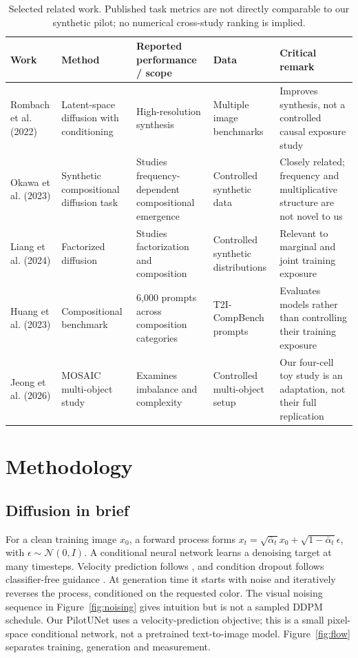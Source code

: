 \documentclass{article}
\begin{document}
\begin{table}[t]\centering\small
\caption{Selected related work. Published task metrics are not directly comparable to our synthetic pilot; no numerical cross-study ranking is implied.}
\begin{tabular}{p{2.0cm}p{3.2cm}p{2.5cm}p{2.7cm}p{3.8cm}}\toprule
Work & Method & Reported performance / scope & Data & Critical remark \\\midrule
Rombach et al. (2022) \cite{rombach2022} & Latent-space diffusion with conditioning & High-resolution synthesis & Multiple image benchmarks & Improves synthesis, not a controlled causal exposure study \\
Okawa et al. (2023) \cite{okawa2023} & Synthetic compositional diffusion task & Studies frequency-dependent compositional emergence & Controlled synthetic data & Closely related; frequency and multiplicative structure are not novel to us \\
Liang et al. (2024) \cite{liang2024} & Factorized diffusion & Studies factorization and composition & Controlled synthetic distributions & Relevant to marginal and joint training exposure \\
Huang et al. (2023) \cite{huang2023} & Compositional benchmark & 6,000 prompts across composition categories & T2I-CompBench prompts & Evaluates models rather than controlling their training exposure \\
Jeong et al. (2026) \cite{jeong2026} & MOSAIC multi-object study & Examines imbalance and complexity & Controlled multi-object setup & Our four-cell toy study is an adaptation, not their full replication \\\bottomrule
\end{tabular}\end{table}

\section{Methodology}
\subsection{Diffusion in brief}
For a clean training image $x_0$, a forward process forms $x_t=\sqrt{\bar\alpha_t}x_0+\sqrt{1-\bar\alpha_t}\epsilon$, with $\epsilon\sim\mathcal N(0,I)$. A conditional neural network learns a denoising target at many timesteps. Velocity prediction follows \cite{salimans2022}, and condition dropout follows classifier-free guidance \cite{ho2022}. At generation time it starts with noise and iteratively reverses the process, conditioned on the requested color. The visual noising sequence in Figure~\ref{fig:noising} gives intuition but is not a sampled DDPM schedule. Our PilotUNet uses a velocity-prediction objective; this is a small pixel-space conditional network, not a pretrained text-to-image model. Figure~\ref{fig:flow} separates training, generation and measurement.
\end{document}
